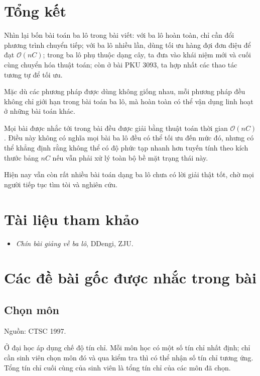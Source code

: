 \documentclass[11pt]{article}
\newcommand{\Oh}{\mathcal{O}}
\begin{document}
\section{Tổng kết}

Nhìn lại bốn bài toán ba lô trong bài viết: với ba lô hoàn toàn, chỉ cần đổi
phương trình chuyển tiếp; với ba lô nhiều lần, dùng tối ưu hàng đợi đơn điệu
để đạt \(\Oh(nC)\); trong ba lô phụ thuộc dạng cây, ta đưa vào khái niệm mới
và cuối cùng chuyển hóa thuật toán; còn ở bài PKU 3093, ta hợp nhất các thao
tác tương tự để tối ưu.

Mặc dù các phương pháp được dùng không giống nhau, mỗi phương pháp đều không
chỉ giới hạn trong bài toán ba lô, mà hoàn toàn có thể vận dụng linh hoạt ở
những bài toán khác.

Mọi bài được nhắc tới trong bài đều được giải bằng thuật toán thời gian
\(\Oh(nC)\). Điều này không có nghĩa mọi bài ba lô đều có thể tối ưu đến mức
đó, nhưng có thể khẳng định rằng không thể có độ phức tạp nhanh hơn tuyến tính
theo kích thước bảng \(nC\) nếu vẫn phải xử lý toàn bộ bề mặt trạng thái này.

Hiện nay vẫn còn rất nhiều bài toán dạng ba lô chưa có lời giải thật tốt, chờ
mọi người tiếp tục tìm tòi và nghiên cứu.

\appendix
\section{Tài liệu tham khảo}

\begin{itemize}
  \item \textit{Chín bài giảng về ba lô}, DDengi, ZJU.
\end{itemize}

\section{Các đề bài gốc được nhắc trong bài}

\subsection{Chọn môn}

Nguồn: CTSC 1997.

Ở đại học áp dụng chế độ tín chỉ. Mỗi môn học có một số tín chỉ nhất định; chỉ
cần sinh viên chọn môn đó và qua kiểm tra thì có thể nhận số tín chỉ tương
ứng. Tổng tín chỉ cuối cùng của sinh viên là tổng tín chỉ của các môn đã chọn.
\end{document}
